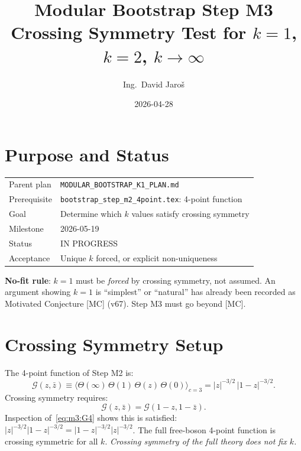 \documentclass[12pt,a4paper]{article}
\title{\textbf{Modular Bootstrap Step M3}\\
         \large Crossing Symmetry Test for $k = 1$, $k = 2$, $k \to \infty$}
\author{Ing.\ David Jaro\v{s}}
\date{2026-04-28}
\theoremstyle{definition}
\theoremstyle{remark}
\begin{document}
  \maketitle
\fi

\section{Purpose and Status}
\label{sec:m3:purpose}

\begin{tcolorbox}[colback=blue!4!white, colframe=blue!50!black,
                  title=Step M3 — Crossing Symmetry Test]
\begin{tabular}{ll}
Parent plan  & \texttt{MODULAR\_BOOTSTRAP\_K1\_PLAN.md} \\
Prerequisite & \texttt{bootstrap\_step\_m2\_4point.tex}: 4-point function \\
Goal         & Determine which $k$ values satisfy crossing symmetry \\
Milestone    & 2026-05-19 \\
Status       & IN PROGRESS \\
Acceptance   & Unique $k$ forced, or explicit non-uniqueness \\
\end{tabular}
\end{tcolorbox}

\begin{warnbox}
\textbf{No-fit rule}: $k = 1$ must be \emph{forced} by crossing symmetry,
not assumed.  An argument showing $k = 1$ is ``simplest'' or ``natural''
has already been recorded as Motivated Conjecture [MC] (v67).  Step M3 must
go beyond [MC].
\end{warnbox}

\section{Crossing Symmetry Setup}
\label{sec:m3:crossing}

The 4-point function of Step M2 is:
\begin{equation}
  \mathcal{G}(z, \bar{z})
  \equiv \bigl\langle \Theta(\infty)\, \Theta(1)\, \Theta(z)\, \Theta(0)
         \bigr\rangle_{c=3}
  = |z|^{-3/2}\, |1 - z|^{-3/2}.
  \label{eq:m3:G4}
\end{equation}
Crossing symmetry requires:
\begin{equation}
  \mathcal{G}(z, \bar{z}) = \mathcal{G}(1-z, 1-\bar{z}).
  \label{eq:m3:crossing}
\end{equation}
Inspection of~\eqref{eq:m3:G4} shows this is satisfied:
$|z|^{-3/2}|1-z|^{-3/2} = |1-z|^{-3/2}|z|^{-3/2}$.
The full free-boson 4-point function is crossing symmetric for all $k$.
\emph{Crossing symmetry of the full theory does not fix $k$.}
\end{document}
